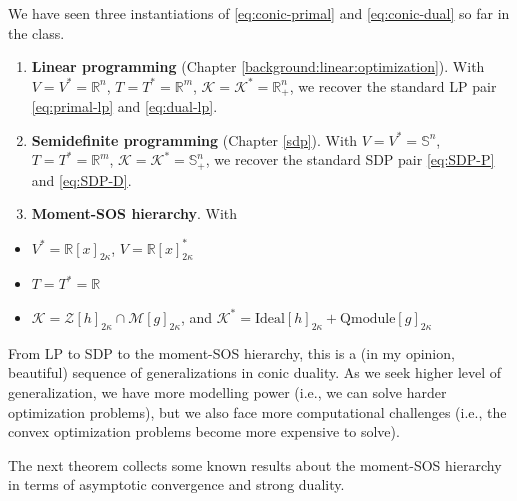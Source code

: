 \documentclass[
]{book}
\providecommand{\tightlist}{%
  \setlength{\itemsep}{0pt}\setlength{\parskip}{0pt}}
\theoremstyle{definition}
\theoremstyle{definition}
\theoremstyle{definition}
\theoremstyle{definition}
\theoremstyle{remark}
\begin{document}
We have seen three instantiations of \eqref{eq:conic-primal} and \eqref{eq:conic-dual} so far in the class.

\begin{enumerate}
\def\labelenumi{\arabic{enumi}.}
\item
  \textbf{Linear programming} (Chapter \ref{background:linear:optimization}). With \(V = V^* = \mathbb{R}^{n}\), \(T = T^* = \mathbb{R}^{m}\), \(\mathcal{K}= \mathcal{K}^* = \mathbb{R}^{n}_{+}\), we recover the standard LP pair \eqref{eq:primal-lp} and \eqref{eq:dual-lp}.
\item
  \textbf{Semidefinite programming} (Chapter \ref{sdp}). With \(V = V^* = \mathbb{S}^{n}\), \(T = T^* = \mathbb{R}^{m}\), \(\mathcal{K}= \mathcal{K}^* = \mathbb{S}^{n}_{+}\), we recover the standard SDP pair \eqref{eq:SDP-P} and \eqref{eq:SDP-D}.
\item
  \textbf{Moment-SOS hierarchy}. With
\end{enumerate}

\begin{itemize}
\tightlist
\item
  \(V^* = \mathbb{R}[x]_{2\kappa}\), \(V = \mathbb{R}[x]_{2\kappa}^*\)
\item
  \(T = T^* = \mathbb{R}^{}\)
\item
  \(\mathcal{K}= \mathcal{Z}[h]_{2\kappa} \cap \mathcal{M}[g]_{2\kappa}\), and \(\mathcal{K}^* = \mathrm{Ideal}[h]_{2\kappa} + \mathrm{Qmodule}[g]_{2\kappa}\)
\end{itemize}

From LP to SDP to the moment-SOS hierarchy, this is a (in my opinion, beautiful) sequence of generalizations in conic duality. As we seek higher level of generalization, we have more modelling power (i.e., we can solve harder optimization problems), but we also face more computational challenges (i.e., the convex optimization problems become more expensive to solve).

The next theorem collects some known results about the moment-SOS hierarchy in terms of asymptotic convergence and strong duality.
\end{document}
